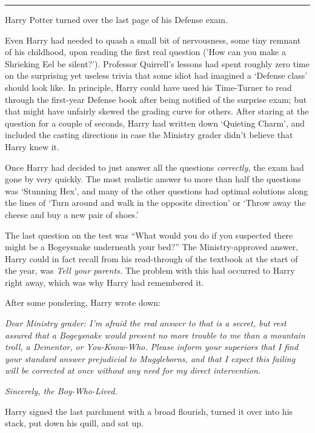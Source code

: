 \begin{center}\rule{3in}{0.4pt}\end{center}

Harry Potter turned over the last page of his Defense exam.

Even Harry had needed to quash a small bit of nervousness, some tiny remnant of his childhood, upon reading the first real question ('How can you make a Shrieking Eel be silent?'). Professor Quirrell's lessons had spent roughly zero time on the surprising yet useless trivia that some idiot had imagined a `Defense class' should look like. In principle, Harry could have used his Time-Turner to read through the first-year Defense book after being notified of the surprise exam; but that might have unfairly skewed the grading curve for others. After staring at the question for a couple of seconds, Harry had written down `Quieting Charm', and included the casting directions in case the Ministry grader didn't believe that Harry knew it.

Once Harry had decided to just answer all the questions \emph{correctly,} the exam had gone by very quickly. The most realistic answer to more than half the questions was `Stunning Hex', and many of the other questions had optimal solutions along the lines of `Turn around and walk in the opposite direction' or `Throw away the cheese and buy a new pair of shoes.'

The last question on the test was ``What would you do if you suspected there might be a Bogeysnake underneath your bed?'' The Ministry-approved answer, Harry could in fact recall from his read-through of the textbook at the start of the year, was \emph{Tell your parents.} The problem with this had occurred to Harry right away, which was why Harry had remembered it.

After some pondering, Harry wrote down:

\emph{Dear Ministry grader: I'm afraid the real answer to that is a secret, but rest assured that a Bogeysnake would present no more trouble to me than a mountain troll, a Dementor, or You-Know-Who. Please inform your superiors that I find your standard answer prejudicial to Muggleborns, and that I expect this failing will be corrected at once without any need for my direct intervention.}

\emph{Sincerely, the Boy-Who-Lived.}

Harry signed the last parchment with a broad flourish, turned it over into his stack, put down his quill, and sat up.

